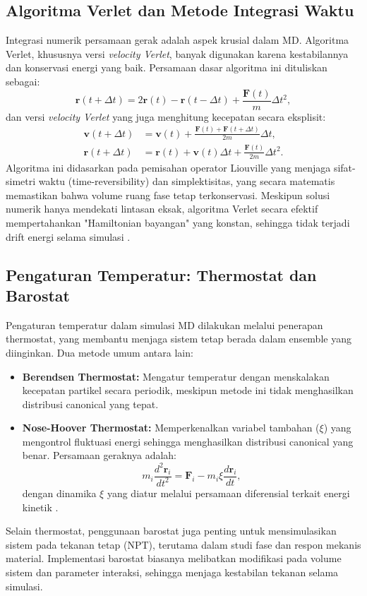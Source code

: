 \subsection{Algoritma Verlet dan Metode Integrasi Waktu}
Integrasi numerik persamaan gerak adalah aspek krusial dalam MD.
Algoritma Verlet, khususnya versi \emph{velocity Verlet}, banyak digunakan karena kestabilannya dan konservasi energi yang baik.
Persamaan dasar algoritma ini dituliskan sebagai:
\begin{equation}
    \mathbf{r}(t+\Delta t) = 2\mathbf{r}(t) - \mathbf{r}(t-\Delta t) + \frac{\mathbf{F}(t)}{m}\Delta t^2,
\end{equation}
dan versi \emph{velocity Verlet} yang juga menghitung kecepatan secara eksplisit:
\begin{align}
    \mathbf{v}(t+\Delta t) &= \mathbf{v}(t) + \frac{\mathbf{F}(t) + \mathbf{F}(t+\Delta t)}{2m}\Delta t, \\
    \mathbf{r}(t+\Delta t) &= \mathbf{r}(t) + \mathbf{v}(t)\Delta t + \frac{\mathbf{F}(t)}{2m}\Delta t^2.
\end{align}
Algoritma ini didasarkan pada pemisahan operator Liouville yang menjaga sifat-simetri waktu (time-reversibility) dan simplektisitas, yang secara matematis memastikan bahwa volume ruang fase tetap terkonservasi.
Meskipun solusi numerik hanya mendekati lintasan eksak, algoritma Verlet secara efektif mempertahankan "Hamiltonian bayangan" yang konstan, sehingga tidak terjadi drift energi selama simulasi \citep{Allen1989}.

\subsection{Pengaturan Temperatur: Thermostat dan Barostat}
Pengaturan temperatur dalam simulasi MD dilakukan melalui penerapan thermostat, yang membantu menjaga sistem tetap berada dalam ensemble yang diinginkan.
Dua metode umum antara lain:
\begin{itemize}
    \item \textbf{Berendsen Thermostat:} Mengatur temperatur dengan menskalakan kecepatan partikel secara periodik, meskipun metode ini tidak menghasilkan distribusi canonical yang tepat.
    \item \textbf{Nose-Hoover Thermostat:} Memperkenalkan variabel tambahan (\(\xi\)) yang mengontrol fluktuasi energi sehingga menghasilkan distribusi canonical yang benar.
Persamaan geraknya adalah:
    \begin{equation}
        m_i \frac{d^2 \mathbf{r}_i}{dt^2} = \mathbf{F}_i - m_i \xi \frac{d\mathbf{r}_i}{dt},
    \end{equation}
    dengan dinamika \(\xi\) yang diatur melalui persamaan diferensial terkait energi kinetik \citep{Allen1989}.
\end{itemize}
Selain thermostat, penggunaan barostat juga penting untuk mensimulasikan sistem pada tekanan tetap (NPT), terutama dalam studi fase dan respon mekanis material.
Implementasi barostat biasanya melibatkan modifikasi pada volume sistem dan parameter interaksi, sehingga menjaga kestabilan tekanan selama simulasi.

